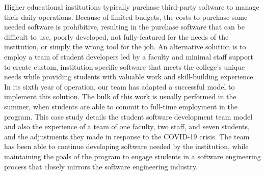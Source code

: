 Higher educational institutions typically purchase third-party software to manage their daily operations. Because of limited budgets, the costs to purchase some needed software is prohibitive, resulting in the purchase software that can be difficult to use, poorly developed, not fully-featured for the needs of the institution, or simply the wrong tool for the job. An alternative solution is to employ a team of student developers led by a faculty and minimal staff support to create custom, institution-specific software that meets the college's unique needs while providing students with valuable work and skill-building experience. In its sixth year of operation, our team has adapted a successful model to implement this solution. The bulk of this work is usually performed in the summer, when students are able to commit to full-time employment in the program. This case study details the student software development team model and also the experience of a team of one faculty, two staff, and seven students, and the adjustments they made in response to the COVID-19 crisis. The team has been able to continue developing software needed by the institution, while maintaining the goals of the program to engage students in a software engineering process that closely mirrors the software engineering industry.


